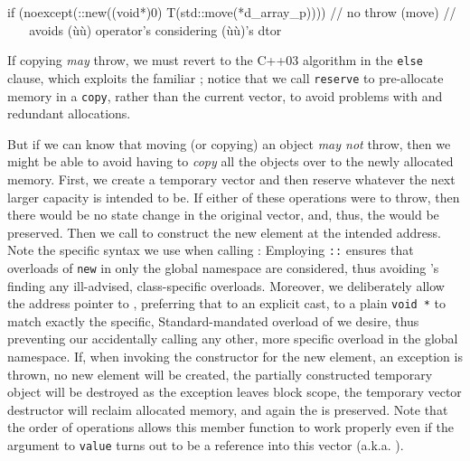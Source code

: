 \begin{emcppslisting}[emcppsignore={extracted from above code}]
 if (noexcept(::new((void*)0) T(std::move(*d_array_p))))  // no throw (move)
 //           ^^^^^^^^^^^^^^^ avoids (ù{}ù) operator's considering (ù{}ù)'s dtor
\end{emcppslisting}
    

\noindent If copying \emph{may} throw, we must revert to the C++03 algorithm in
the \lstinline!else! clause, which exploits the familiar ; notice that we call \lstinline!reserve! to pre-allocate memory in a
\lstinline!copy!, rather than the current vector, to avoid problems with
 and redundant allocations.

But if we can know that moving (or copying) an object \emph{may not}
throw, then we might be able to avoid having to \emph{copy} all the
objects over to the newly allocated memory. First, we create a temporary
vector and then reserve whatever the next larger capacity is intended to
be. If either of these operations were to throw, then there would be no
state change in the original vector, and, thus, the  would be preserved. Then we call
 to construct the new element at the
intended address. Note the specific syntax we use when calling
: Employing \lstinline!::! ensures that overloads of
\lstinline!new! in only the global namespace are considered, thus avoiding
's finding any ill-advised, class-specific overloads.
Moreover, we deliberately allow the address pointer to ,
preferring that to an explicit cast, to a plain \lstinline!void!~\lstinline!*!
to match exactly the specific, Standard-mandated overload of
 we desire, thus preventing our accidentally
calling any other, more specific overload in the global namespace. If,
when invoking the constructor for the new element, an exception is
thrown, no new element will be created, the partially constructed
temporary object will be destroyed as the exception leaves block scope,
the temporary vector destructor will reclaim allocated memory, and again
the  is preserved. Note that the order of
operations allows this member function to work properly even if the
argument to \lstinline!value! turns out to be a reference into this vector
(a.k.a. ).

